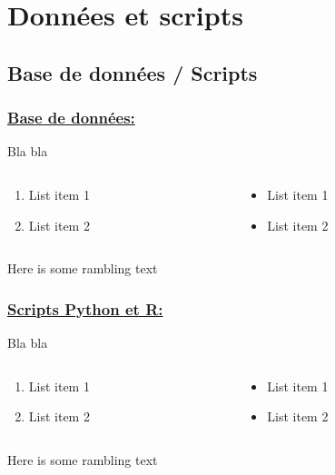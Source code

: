 \documentclass[xcolor=dvipsnames]{beamer}
\begin{document}
	\section*{Données et scripts}
	\subsection*{Base de données / Scripts} %
	\begin{frame}
		\frametitle{\underline{Base de données:}}
		Bla bla 
		\begin{columns}
			\begin{column}{0.5\textwidth} %
				\begin{enumerate}
					\item List item 1
					\item List item 2
				\end{enumerate}
			\end{column}
			\begin{column}{0.5\textwidth}
				\begin{itemize}
					\item List item 1
					\item List item 2
				\end{itemize}
			\end{column}
		\end{columns}
		\vspace{\baselineskip}
		Here is some rambling text
	\end{frame}

	\begin{frame}
		\frametitle{\underline{Scripts Python et R:}}
		Bla bla 
		\begin{columns}
			\begin{column}{0.5\textwidth} %
				\begin{enumerate}
					\item List item 1
					\item List item 2
				\end{enumerate}
			\end{column}
			\begin{column}{0.5\textwidth}
				\begin{itemize}
					\item List item 1
					\item List item 2
				\end{itemize}
			\end{column}
		\end{columns}
		\vspace{\baselineskip}
		Here is some rambling text
	\end{frame}
\end{document}
